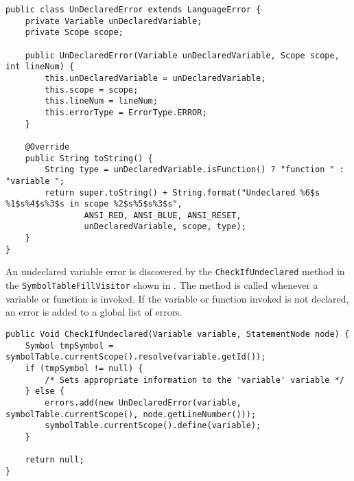 \begin{lstlisting}[caption=The UnDeclaredError class in the \gls{gamble} compiler,numbers=none,frame=tlrb,label={lst:undeclarederrorclass}]
public class UnDeclaredError extends LanguageError {
    private Variable unDeclaredVariable;
    private Scope scope;

    public UnDeclaredError(Variable unDeclaredVariable, Scope scope, int lineNum) {
        this.unDeclaredVariable = unDeclaredVariable;
        this.scope = scope;
        this.lineNum = lineNum;
        this.errorType = ErrorType.ERROR;
    }

    @Override
    public String toString() {
        String type = unDeclaredVariable.isFunction() ? "function " : "variable ";
        return super.toString() + String.format("Undeclared %6$s %1$s%4$s%3$s in scope %2$s%5$s%3$s",
                ANSI_RED, ANSI_BLUE, ANSI_RESET,
                unDeclaredVariable, scope, type);
    }
}
\end{lstlisting}

An undeclared variable error is discovered by the \texttt{CheckIfUndeclared} method in the \texttt{SymbolTableFillVisitor} shown in .
The method is called whenever a variable or function is invoked.
If the variable or function invoked is not declared, an error is added to a global list of errors. 
\begin{lstlisting}[caption=The CheckIfUndeclared method in the SymbolTableFillVisitor class in the \gls{gamble} compiler,numbers=none,frame=tlrb,label={lst:CheckIfUndeclared}]
public Void CheckIfUndeclared(Variable variable, StatementNode node) {
    Symbol tmpSymbol = symbolTable.currentScope().resolve(variable.getId());
    if (tmpSymbol != null) {
        /* Sets appropriate information to the 'variable' variable */
    } else {
        errors.add(new UnDeclaredError(variable, symbolTable.currentScope(), node.getLineNumber()));
        symbolTable.currentScope().define(variable);
    }

    return null;
}
\end{lstlisting}
